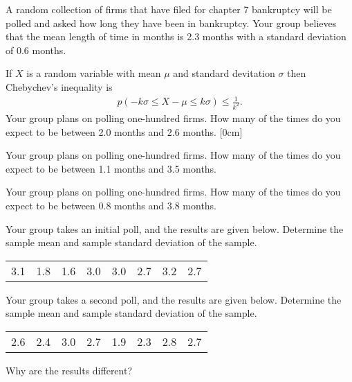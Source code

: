 \begin{problem}
\item A random collection of firms that have filed for chapter 7 bankruptcy will
  be polled and asked how long they have been in bankruptcy. Your
  group believes that the mean length of time in months is 2.3 months
  with a standard deviation of 0.6 months.

  \begin{subproblem}
  \item If $X$ is a random variable with mean $\mu$ and standard
    devitation $\sigma$ then Chebychev's inequality is
    \begin{eqnarray*}
      p\left( -k \sigma \leq X - \mu \leq k \sigma \right) \leq \frac{1}{k^2}.
    \end{eqnarray*}
    Your group plans on polling one-hundred firms. How many of the
    times do you expect to be between 2.0 months and 2.6 months.
    [0cm]

    \vfill

  \item Your group plans on polling one-hundred firms. How many of the
    times do you expect to be between 1.1 months and 3.5 months.

    \vfill

  \item Your group plans on polling one-hundred firms. How many of the
    times do you expect to be between 0.8 months and 3.8 months.

    \vfill

    \clearpage

  \item Your group takes an initial poll, and the results are given
    below. Determine the sample mean and sample standard deviation of
    the sample. \\
    \begin{tabular}{rrrrrrrr}
      3.1 & 1.8 & 1.6 & 3.0 & 3.0 & 2.7 & 3.2 & 2.7
    \end{tabular}

    \vfill

  \item Your group takes a second poll, and the results are given
    below. Determine the sample mean and sample standard deviation of
    the sample. \\
    \begin{tabular}{rrrrrrrr}
      2.6 & 2.4 & 3.0 & 2.7 & 1.9 & 2.3 & 2.8 & 2.7
    \end{tabular}

    \vfill

  \item Why are the results different?

    \vspace{4em}

  \end{subproblem}

\end{problem}

